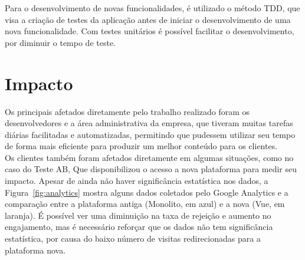 Para o desenvolvimento de novas funcionalidades, é utilizado o método \gls{TDD}, que visa a criação de testes da aplicação antes de iniciar o desenvolvimento de uma nova funcionalidade. Com testes unitários é possível facilitar o desenvolvimento, por diminuir o tempo de teste.

%

\section{Impacto}

Os principais afetados diretamente pelo trabalho realizado foram os desenvolvedores e a área administrativa da empresa, que tiveram muitas tarefas diárias facilitadas e automatizadas, permitindo que pudessem utilizar seu tempo de forma mais eficiente para produzir um melhor conteúdo para os clientes.\\

Os clientes também foram afetados diretamente em algumas situações, como no caso do \gls{Teste AB}, Que disponibilizou o acesso a nova plataforma para medir seu impacto. Apesar de ainda não haver significância estatística nos dados, a Figura~\ref{fig:analytics} mostra alguns dados coletados pelo Google Analytics e a comparação entre a plataforma antiga (Monolito, em azul) e a nova (Vue, em laranja). É possível ver uma diminuição na taxa de rejeição e aumento no engajamento, mas é necessário reforçar que os dados não tem significância estatística, por causa do baixo número de visitas redirecionadas para a plataforma nova.\\

